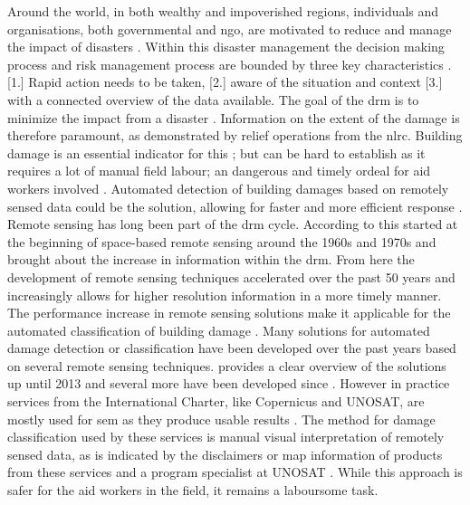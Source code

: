 \noindent Around the world, in both wealthy and impoverished regions, individuals and organisations, both governmental and \ac{ngo}, are motivated to reduce and manage the impact of disasters \citep{Coppola2015}. Within this disaster management the decision making process and risk management process are bounded by three key characteristics \citep{Zlatanova2008}. [1.] Rapid action needs to be taken, [2.] aware of the situation and context [3.] with a connected overview of the data available. The goal of the \ac{drm} is to minimize the impact from a disaster \citep{Piero2012}. Information on the extent of the damage is therefore paramount, as demonstrated by relief operations from the \ac{nlrc}. Building damage is an essential indicator for this \citep{Schweier2006}; but can be hard to establish as it requires a lot of manual field labour; an dangerous and timely ordeal for aid workers involved \citep{Kerle2010}. Automated detection of building damages based on remotely sensed data could be the solution, allowing for faster and more efficient response \citep{Vetrivel2016b}. \\

\noindent Remote sensing has long been part of the \ac{drm} cycle. According to \citet{Kerle2015} this started at the beginning of space-based remote sensing around the 1960s and 1970s and brought about the increase in information within the \ac{drm}. From here the development of remote sensing techniques accelerated over the past 50 years and increasingly allows for higher resolution information in a more timely manner. The performance increase in remote sensing solutions make it applicable for the automated classification of building damage \citep{DellAcqua2012,Dong2013}. Many solutions for automated damage detection or classification have been developed over the past years based on several remote sensing techniques. \citet{Dong2013} provides a clear overview of the solutions up until 2013 and several more have been developed since \citep{Dominici2017,Sharma2017,Kakooei2017,Vetrivel2016b,Menderes2015}. However in practice services from the International Charter, like Copernicus and UNOSAT, are mostly used for \ac{sem} \citep{Voigt2016} as they produce usable results \citep{Kerle2010}. The method for damage classification used by these services is manual visual interpretation of remotely sensed data, as is indicated by the disclaimers or map information of products from these services and a program specialist at UNOSAT \citep{Cop2017,UNDAC2017}. While this approach is safer for the aid workers in the field, it remains a laboursome task.


